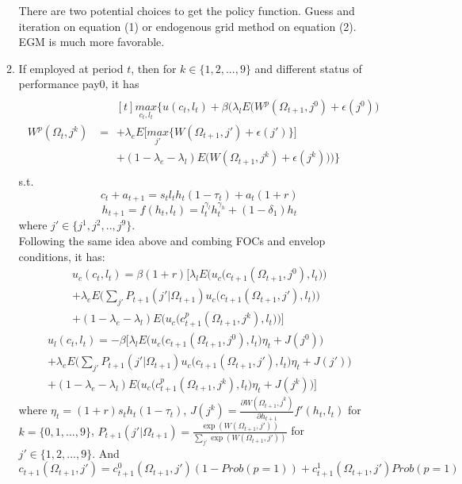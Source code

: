 \documentclass{article}
\begin{document}
\begin{enumerate}[{}1{).}]
\begin{enumerate}[{}a{).}]
					There are two potential choices to get the policy function. Guess and iteration on equation (1) or endogenous grid method on equation (2). EGM is much more favorable.
					\item If employed at period $t$, then for $k \in \{1, 2,..., 9\}$ and different status of performance pay0, it has
						\begin{align*}
							\begin{split}
								W^p(\Omega_{t}, j^k) &= 
									\!\begin{multlined}[t] 
										\underset{c_t, l_t}{max}\Bigg\{u(c_t, l_t) + \beta\bigg( \lambda_l E\Big(W^p(\Omega_{t+1}, j^0) + \epsilon(j^0)\Big) \\
										+ \lambda_e E\big[\underset{j'}{max}\big\{W(\Omega_{t+1}, j') + \epsilon(j') \big\} \big] \\
										+ (1-\lambda_e - \lambda_l)E\Big(W(\Omega_{t+1}, j^k) + \epsilon(j^k)\Big) \bigg) \Bigg\} 
									\end{multlined} 
							\end{split}
						\end{align*}
					s.t. 
					$$c_t + a_{t+1} = s_t l_t h_t (1-\tau_t) + a_t(1+r) $$
					$$ h_{t+1} = f(h_t, l_t) =  l_t^{\gamma_l} h_t^{\gamma_h} + (1 - \delta_1)h_t$$
					where $j' \in \{j^1, j^2, .., j^9\}$. \\
					Following the same idea above and combing FOCs and envelop conditions,  it has:
						\begin{multline*}
							u_c(c_t, l_t) = \beta(1+r)\bigg[ \lambda_l E\Big(u_c\big(c_{t+1}(\Omega_{t+1}, j^0), l_t \big) \Big) \\
							 + \lambda_e E\Big( \sum_{j'}P_{t+1}(j'|\Omega_{t+1}) u_c\big(c_{t+1}(\Omega_{t+1}, j'), l_t \big) \Big) \\
							 + (1-\lambda_e-\lambda_l) E\Big( u_c\big(c^p_{t+1}(\Omega_{t+1}, j^k), l_t \big) \Big)  \bigg] \tag{3} 
						\end{multline*}	
						\begin{multline*}
							u_l(c_t, l_t) = -\beta\bigg[ \lambda_l E\Big(u_c\big(c_{t+1}(\Omega_{t+1}, j^0), l_t \big)\eta_t + J(j^0) \Big) \\
							+ \lambda_e E\Big( \sum_{j'}P_{t+1}(j'|\Omega_{t+1}) u_c\big(c_{t+1}(\Omega_{t+1}, j'), l_t \big)\eta_t + J(j') \Big) \\
							+ (1-\lambda_e-\lambda_l) E\Big( u_c\big(c^p_{t+1}(\Omega_{t+1}, j^k), l_t \big)\eta_t + J(j^k) \Big)  \bigg] \tag{4}
						\end{multline*}	
					where $\eta_t = (1+r)s_t h_t (1-\tau_t)$, $J(j^k) = \frac{\partial W(\Omega_{t+1}, j^k)}{\partial h_{t+1}} f'(h_t, l_t)$ for $k = \{0, 1,..., 9\}$,  $P_{t+1}(j'|\Omega_{t+1}) = \frac{\exp(W(\Omega_{t+1}, j'))}{\sum_{j'}\exp(W(\Omega_{t+1}, j'))}$ for $j' \in \{1,2,...,9\}$. And
						$$ c_{t+1}(\Omega_{t+1}, j') = c^0_{t+1}(\Omega_{t+1}, j')(1 - Prob(p=1)) +  c^1_{t+1}(\Omega_{t+1}, j')Prob(p=1) $$ 
				\end{enumerate}
		\end{enumerate}
\end{document}
